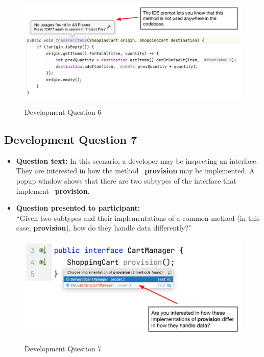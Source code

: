 \begin{figure}[ht]
\centering
\caption{Development Question 6}
\includegraphics[width=\textwidth]{./figs/ds6.png}
\label{fig:DS6}
\end{figure}

\subsection{Development Question 7}

\begin{itemize}
  \item[] \textbf{Question text:} In this scenario, a developer may be 
          inspecting an interface. They are interested in how the method 
          \textbf{provision} may be implemented. A popup window shows that 
          there are two subtypes of the interface that implement 
          \textbf{provision}.
  \item[] \textbf{Question presented to participant:}  \\
          ``Given two subtypes and their implementations of a common method 
          (in this case, \textbf{provision}), how do they handle data 
          differently?"
\end{itemize}

\begin{figure}[ht]
\centering
\caption{Development Question 7}
\includegraphics[width=\textwidth]{./figs/ds7.png}
\label{fig:DS7}
\end{figure}

